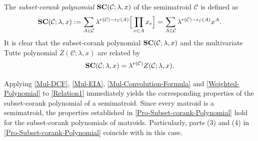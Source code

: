 \documentclass[12pt]{article}%
\renewcommand*{\bm}[1]{#1}%
\numberwithin{equation}{section}
\begin{document}
The {\em subset-corank polynomial} ${\bf SC}(\mathcal{C};\lambda,\bm x)$ of the semimatroid $\mathcal{C}$ is defined as
\[
{\bf SC}(\mathcal{C};\lambda,\bm x):=\sum_{A\in\mathcal{C}}\lambda^{r(\mathcal{C})-r_{\mathcal{C}}(A)}\Big[\prod_{e\in A}x_e\Big]=\sum_{A\in\mathcal{C}}\lambda^{r(\mathcal{C})-
r_{\mathcal{C}}(A)}\bm x^A.
\]
It is clear that the  subset-corank polynomial ${\bf SC}(\mathcal{C};\lambda,\bm x)$ and the multivariate Tutte polynomial $Z(\mathcal{C};\lambda,\bm x)$ are related by
\begin{equation}\label{Relation1}
{\bf SC}(\mathcal{C};\lambda,\bm x)=\lambda^{r(\mathcal{C})}Z(\mathcal{C};\lambda,\bm x).
\end{equation}

Applying \autoref{Mul-DCF}, \autoref{Mul-EIA}, \autoref{Mul-Convolution-Formula} and \autoref{Weighted-Polynomial} to \eqref{Relation1} immediately yields the corresponding properties of the subset-corank polynomial of a semimatroid. Since every matroid is a semimatroid, the properties established in \autoref{Pro-Subset-corank-Polynomial} hold for the subset-corank polynomials of matroids. Particularly, parts (3) and (4) in \autoref{Pro-Subset-corank-Polynomial} coincide with \cite[Identity 1, Identity 4  and Identity 5]{Kung2010} in this case.
\end{document}

